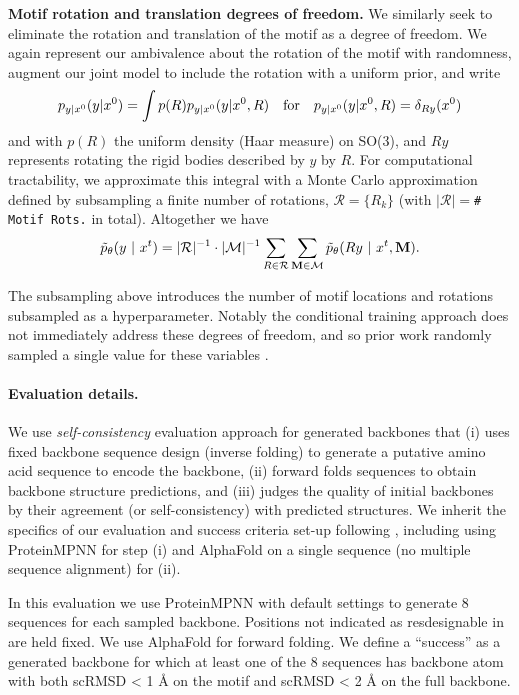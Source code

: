 \textbf{Motif rotation and translation degrees of freedom.}  We similarly seek to eliminate the rotation and translation of the motif as a degree of freedom. 
We again represent our ambivalence about the rotation of the motif with randomness,
augment our joint model to include the rotation with a uniform prior, 
and write
\begin{align}
p_{y|x^{0}}({y}|{x^{0}})=\int p(R)p_{y|x^{0}}({y}|{x^{0}, R})\quad  \mathrm{for}\quad p_{y|x^{0}}({y}|{x^{0}, R})=\delta_{Ry}(x^{0})
\end{align}
and with $p(R)$ the uniform density (Haar measure) on SO(3), and $Ry$ represents rotating the rigid bodies described by $y$ by $R.$ 
For computational tractability, we approximate this integral with a Monte Carlo approximation defined by subsampling a finite number of rotations, $\mathcal{R} = \{R_k\}$ (with $|\mathcal{R}|=$\texttt{\# Motif Rots.} in total).
Altogether we have
$$
\tilde p_\theta(y~\vert~ x^{t}) = |\mathcal{R}|^{-1} \cdot |\mathcal{M}|^{-1} \sum_{R \in \mathcal{R}} \sum_{\mathbf{M} \in \mathcal{M}} \tilde p_\theta(Ry~\vert~ x^{t}, \mathbf{M}).
$$

The subsampling above introduces the number of motif locations and rotations subsampled as a hyperparameter.
Notably the conditional training approach does not immediately address these degrees of freedom,
and so prior work randomly sampled a single value for these variables \citep{trippe2022diffusion,wang2022scaffolding,watson2022broadly}.

\paragraph{Evaluation details.}
We use \emph{self-consistency} evaluation approach for generated backbones \citep{trippe2022diffusion} that 
(i) uses fixed backbone sequence design (inverse folding) to generate a putative amino acid sequence to encode the backbone, 
(ii) forward folds sequences to obtain backbone structure predictions, and
(iii) judges the quality of initial backbones by their agreement (or self-consistency) with predicted structures.
We inherit the specifics of our evaluation and success criteria set-up following \citep{watson2022broadly}, including
using ProteinMPNN \citep{dauparas2022robust} for step (i) and AlphaFold \citep{jumper2021highly} on a single sequence (no multiple sequence alignment) for (ii).

In this evaluation we use ProteinMPNN \citep{dauparas2022robust} with default settings to generate 8 sequences for each sampled backbone.
Positions not indicated as resdesignable in \citep[Methods Table 9]{watson2022broadly} are held fixed.
We use AlphaFold \citep{jumper2021highly} for forward folding.
We define a ``success'' as a generated backbone for which at least one of the 8 sequences has backbone atom with both 
scRMSD < 1 {\AA} on the motif and 
scRMSD < 2 {\AA} on the full backbone.

